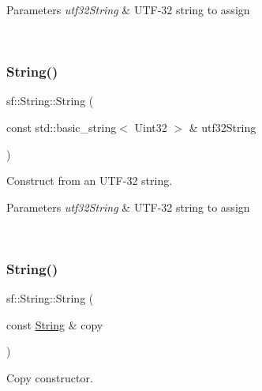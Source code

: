 \begin{DoxyParams}{Parameters}
{\em utf32\+String} & U\+T\+F-\/32 string to assign \begin{DoxyVerb}\end{DoxyVerb}
 \\
\hline
\end{DoxyParams}
\mbox{\label{classsf_1_1_string_a6eee86dbe75d16bbcc26e97416c2e1ca}} 
\subsubsection{\texorpdfstring{String()}{String()}\hspace{0.1cm}{\footnotesize\ttfamily [10/11]}}
{\footnotesize\ttfamily sf\+::\+String\+::\+String (\begin{DoxyParamCaption}\item[{const std\+::basic\+\_\+string$<$ Uint32 $>$ \&}]{utf32\+String }\end{DoxyParamCaption})}



Construct from an U\+T\+F-\/32 string. 


\begin{DoxyParams}{Parameters}
{\em utf32\+String} & U\+T\+F-\/32 string to assign \begin{DoxyVerb}\end{DoxyVerb}
 \\
\hline
\end{DoxyParams}
\mbox{\label{classsf_1_1_string_af862594d3c4070d8ddbf08cf8dce4f59}} 
\subsubsection{\texorpdfstring{String()}{String()}\hspace{0.1cm}{\footnotesize\ttfamily [11/11]}}
{\footnotesize\ttfamily sf\+::\+String\+::\+String (\begin{DoxyParamCaption}\item[{const \mbox{\hyperlink{classsf_1_1_string}{String}} \&}]{copy }\end{DoxyParamCaption})}



Copy constructor. 


